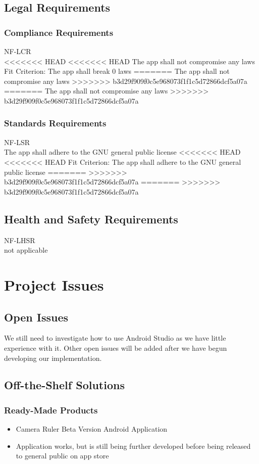 \documentclass[12pt, titlepage]{article}
\begin{document}
\subsection{Legal Requirements}
\subsubsection{Compliance Requirements}
NF-LCR \\
<<<<<<< HEAD
<<<<<<< HEAD
The app shall not compromise any laws
{\color{red}Fit Criterion: The app shall break 0 laws }
=======
The app shall not compromise any laws 
>>>>>>> b3d29f909f0c5e968073f1f1c5d72866dcf5a07a
=======
The app shall not compromise any laws 
>>>>>>> b3d29f909f0c5e968073f1f1c5d72866dcf5a07a

\subsubsection{Standards Requirements}
NF-LSR \\
The app shall adhere to the GNU general public license 
<<<<<<< HEAD
<<<<<<< HEAD
{\color{red}Fit Criterion: The app shall adhere to the GNU general public license }
=======
>>>>>>> b3d29f909f0c5e968073f1f1c5d72866dcf5a07a
=======
>>>>>>> b3d29f909f0c5e968073f1f1c5d72866dcf5a07a

\subsection{Health and Safety Requirements}
NF-LHSR \\
not applicable 

\section{Project Issues}

\subsection{Open Issues}
We still need to investigate how to use Android Studio as we have little experience with it. Other open issues will be added after we have begun developing our implementation.

\subsection{Off-the-Shelf Solutions}
\subsubsection{Ready-Made Products}
\begin{itemize}
\item Camera Ruler Beta Version Android Application
    \item{Application works, but is still being further developed before being released to general public on app store}
\end{itemize}
\end{document}
